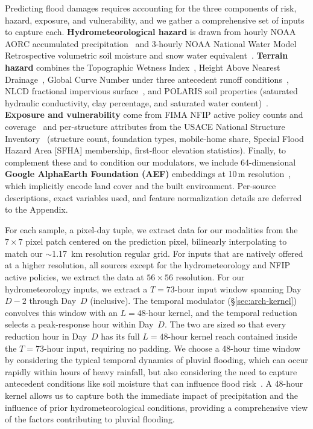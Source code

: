Predicting flood damages requires accounting for the three components of risk, hazard, exposure, and vulnerability, and we gather a comprehensive set of inputs to capture each.
%
\textbf{Hydrometeorological hazard} is drawn from hourly NOAA AORC accumulated precipitation~\cite{fall_analysis_2023} and 3-hourly NOAA National Water Model Retrospective volumetric soil moisture and snow water equivalent~\cite{cosgrove_noaas_2024}.
%
\textbf{Terrain hazard} combines the Topographic Wetness Index~\cite{hoylman_30m_2021}, Height Above Nearest Drainage~\cite{aws_copernicus_dem}, Global Curve Number under three antecedent runoff conditions~\cite{jaafar_gcn250_2019}, NLCD fractional impervious surface~\cite{usgs_annual_nlcd_2024}, and POLARIS soil properties (saturated hydraulic conductivity, clay percentage, and saturated water content)~\cite{chaney_polaris_2019}.
%
\textbf{Exposure and vulnerability} come from FIMA NFIP active policy counts and coverage~\cite{fema_nfip_policies_v2} and per-structure attributes from the USACE National Structure Inventory~\cite{usace_nsi_2022} (structure count, foundation types, mobile-home share, Special Flood Hazard Area [SFHA] membership, first-floor elevation statistics).
%
Finally, to complement these and to condition our modulators, we include 64-dimensional \textbf{Google AlphaEarth Foundation (AEF)} embeddings at 10\,m resolution~\cite{brown_alphaearth_2025}, which implicitly encode land cover and the built environment.
%
Per-source descriptions, exact variables used, and feature normalization details are deferred to the Appendix.

For each sample, a pixel-day tuple, we extract data for our modalities from the $7 \times 7$ pixel patch centered on the prediction pixel, bilinearly interpolating to match our $\sim$1.17~km resolution regular grid.
%
For inputs that are natively offered at a higher resolution, all sources except for the hydrometeorology and NFIP active policies, we extract the data at $56\times 56$ resolution.
%
For our hydrometeorology inputs, we extract a $T=73$-hour input window spanning Day~$D-2$ through Day~$D$ (inclusive).
%
The temporal modulator (\S\ref{sec:arch-kernel}) convolves this window with an $L=48$-hour kernel, and the temporal reduction selects a peak-response hour within Day~$D$.
%
The two are sized so that every reduction hour in Day~$D$ has its full $L=48$-hour kernel reach contained inside the $T=73$-hour input, requiring no padding.
%
We choose a 48-hour time window by considering the typical temporal dynamics of pluvial flooding, which can occur rapidly within hours of heavy rainfall, but also considering the need to capture antecedent conditions like soil moisture that can influence flood risk~\cite{bouwens2018towards,upreti2021comparison,james_precipitation_2024}.
%
A 48-hour kernel allows us to capture both the immediate impact of precipitation and the influence of prior hydrometeorological conditions, providing a comprehensive view of the factors contributing to pluvial flooding.
%

